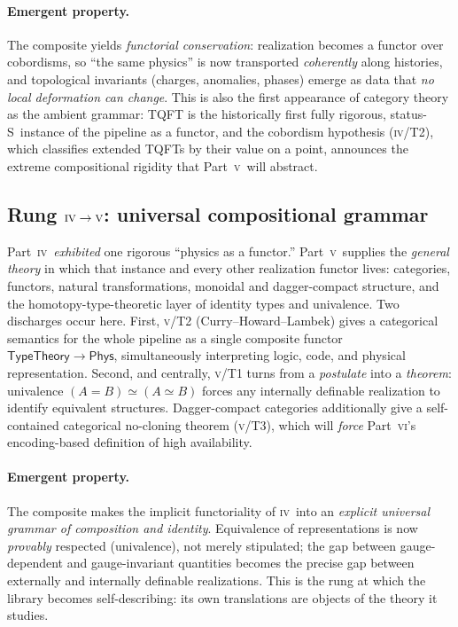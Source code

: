 \documentclass[12pt]{article}
\theoremstyle{definition}
\theoremstyle{remark}
\newcommand{\Phys}{\mathsf{Phys}}
\newcommand{\Sstat}{\textsf{S}}
\newcommand{\PIV}{\textsc{iv}}
\newcommand{\PV}{\textsc{v}}
\newcommand{\PVI}{\textsc{vi}}
\begin{document}
\paragraph{Emergent property.}
The composite yields \emph{functorial conservation}: realization becomes a functor
over cobordisms, so ``the same physics'' is now transported \emph{coherently} along
histories, and topological invariants (charges, anomalies, phases) emerge as data that
\emph{no local deformation can change}.  This is also the first appearance of category
theory as the ambient grammar: TQFT is the historically first fully rigorous,
status-\Sstat\ instance of the pipeline as a functor, and the cobordism hypothesis
(\PIV/T2), which classifies extended TQFTs by their value on a point, announces the
extreme compositional rigidity that Part~\PV\ will abstract.

\subsection{Rung \texorpdfstring{$\PIV\to\PV$}{IV to V}: universal compositional grammar}
\label{sec:rung5}

Part~\PIV\ \emph{exhibited} one rigorous ``physics as a functor.''  Part~\PV\ supplies
the \emph{general theory} in which that instance and every other realization functor
lives: categories, functors, natural transformations, monoidal and dagger-compact
structure, and the homotopy-type-theoretic layer of identity types and univalence.
Two discharges occur here.  First, \PV/T2 (Curry--Howard--Lambek) gives a categorical
semantics for the whole pipeline as a single composite functor
$\mathsf{TypeTheory}\to\Phys$, simultaneously interpreting logic, code, and physical
representation.  Second, and centrally, \PV/T1 turns  from a
\emph{postulate} into a \emph{theorem}: univalence $(A=B)\simeq(A\simeq B)$ forces any
internally definable realization to identify equivalent structures.  Dagger-compact
categories additionally give a self-contained categorical no-cloning theorem (\PV/T3),
which will \emph{force} Part~\PVI's encoding-based definition of high availability.

\paragraph{Emergent property.}
The composite makes the implicit functoriality of \PIV\ into an \emph{explicit
universal grammar of composition and identity}.  Equivalence of representations is now
\emph{provably} respected (univalence), not merely stipulated; the gap between
gauge-dependent and gauge-invariant quantities becomes the precise gap between
externally and internally definable realizations.  This is the rung at which the
library becomes self-describing: its own translations are objects of the theory it
studies.
\end{document}
